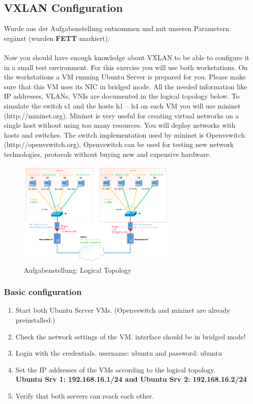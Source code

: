 \documentclass[a4,12pt]{scrartcl}
\begin{document}
\subsection{VXLAN Configuration}
Wurde aus der Aufgabenstellung entnommen und mit unseren Parametern ergänzt (wurden \textbf{FETT} markiert): \\
\\
Now you should have enough knowledge about VXLAN to be able to configure it in a small test environment. For this exercise you will use both workstations. On the workstations a VM running Ubuntu Server is prepared for you. Please make sure that this VM uses its NIC in bridged mode. All the needed information like IP addresses, VLANs, VNIs are documented in the logical topology below.
To simulate the switch s1 and the hosts h1 – h4 on each VM you will use mininet (http://mininet.org).
Mininet is very useful for creating virtual networks on a single host without using too many resources. You will deploy networks with hosts and switches. The switch implementation used by mininet is Openvswitch (http://openvswitch.org). Openvswitch can be used for testing new network technologies, protocols without buying new and expensive hardware.

\begin{figure} [H]
	\begin{center}
	\includegraphics[width=0.70\textwidth]{./pictures/vxlan_config.png}
	\caption{Aufgabenstellung: Logical Topology}
	\label{x}
	\end{center}
\end{figure}

\subsubsection{Basic configuration}
\begin{enumerate}
\item Start both Ubuntu Server VMs. (Openvswitch and mininet are already preinstalled.)
\item Check the network settings of the VM. interface should be in bridged mode!
\item Login with the credentials. username: ubuntu and password: ubuntu
\item Set the IP addresses of the VMs according to the logical topology.\\
\textbf{Ubuntu Srv 1: 192.168.16.1/24 and Ubuntu Srv 2: 192.168.16.2/24}
\item Verify that both servers can reach each other.
\end{enumerate}
\end{document}
